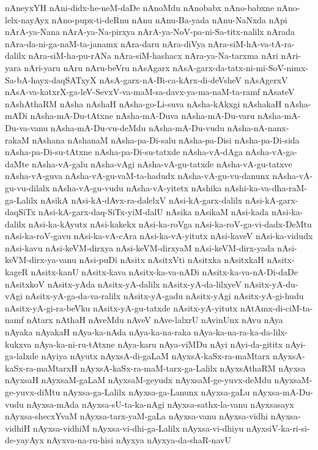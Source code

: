 {nAneyxYH
nAni-didx-he-neM-daDe
nAnoMdu
nAnobabx
nAno-babxne
nAno-lelx-nayAyx
nAno-pupx-ti-deRnu
nAnu
nAnu-Ba-yada
nAnu-NaNxda
nApi
nArA-ya-Nana
nArA-ya-Na-pirxya
nArA-ya-NoV-pa-ni-Sa-titx-nalilx
nArada
nAra-da-ni-ga-naM-ta-janamx
nAra-daru
nAra-diVya
nAra-siM-hA-va-tA-ra-dalilx
nAra-siM-ha-pu-rANa
nAra-siM-hashacx
nAra-ya-Na-tarxma
nAri
nAri-yara
nAri-yaru
nAru
nAru-beVru
nAsAgarx
nAsA-garx-da-tatx-ni-mi-SoV-nimx-Sa-bA-hayx-daqSATxyX
nAsA-garx-nA-Bi-ca-kArx-di-deVsheV
nAsAgerxV
nAsA-va-katxrX-ga-leV-SevxV-va-maM-sa-davx-ya-ma-naM-ta-ramf
nAsateV
nAshAthaRM
nAsha
nAshaH
nAsha-go-Li-suva
nAsha-kAkxgi
nAshakaH
nAsha-mADi
nAsha-mA-Du-tAtxne
nAsha-mA-Duva
nAsha-mA-Du-varu
nAsha-mA-Du-va-vanu
nAsha-mA-Du-vu-deMdu
nAsha-mA-Du-vudu
nAsha-nA-nanx-rakaM
nAshana
nAshanaM
nAsha-pa-Di-salu
nAsha-pa-Disi
nAsha-pa-Di-sida
nAsha-pa-Di-su-tAtxne
nAsha-pa-Di-su-tatxde
nAsha-vA-dAga
nAsha-vA-ga-daMte
nAsha-vA-galu
nAsha-vAgi
nAsha-vA-gu-tatxde
nAsha-vA-gu-tatxve
nAsha-vA-guva
nAsha-vA-gu-vaM-ta-hadudx
nAsha-vA-gu-vu-danunx
nAsha-vA-gu-vu-dilalx
nAsha-vA-gu-vudu
nAsha-vA-yitetx
nAshika
nAshi-ka-va-dha-raM-ga-Lalilx
nAsikA
nAsi-kA-dAvx-ra-dalelxV
nAsi-kA-garx-dalilx
nAsi-kA-garx-daqSiTx
nAsi-kA-garx-daq-SiTx-yiM-dalU
nAsika
nAsikaM
nAsi-kada
nAsi-ka-dalilx
nAsi-ka-kAyutx
nAsi-kakekx
nAsi-ka-roVga
nAsi-ka-roV-ga-vi-dadx-DeMtu
nAsi-ka-roV-gavu
nAsi-ka-vA-cAra
nAsi-ka-vA-yitutx
nAsi-kaveV
nAsi-ka-vidudx
nAsi-kavu
nAsi-keVM-dirxya
nAsi-keVM-dirxyaM
nAsi-keVM-dirx-yada
nAsi-keVM-dirx-ya-vanu
nAsi-puDi
nAsitx
nAsitxVti
nAsitxka
nAsitxkaH
nAsitx-kageR
nAsitx-kanU
nAsitx-kava
nAsitx-ka-va-nADi
nAsitx-ka-va-nA-Di-daDe
nAsitxkoV
nAsitx-yAda
nAsitx-yA-dalilx
nAsitx-yA-da-lilxyeV
nAsitx-yA-du-vAgi
nAsitx-yA-ga-da-va-ralilx
nAsitx-yA-gadu
nAsitx-yAgi
nAsitx-yA-gi-hudu
nAsitx-yA-gi-ra-beVku
nAsitx-yA-gu-tatxde
nAsitx-yA-yitutx
nAtAmx-di-ciM-ta-namf
nAtarx
nAthaH
nAveMdu
nAveV
nAve-lalxrU
nAvinUnx
nAvu
nAya
nAyaka
nAyakaH
nAya-ka-nAda
nAya-ka-na-raka
nAya-ka-na-ra-ka-da-lilx-kukxva
nAya-ka-ni-ru-tAtxne
nAya-karu
nAya-viMDu
nAyi
nAyi-da-gititx
nAyi-ga-lalxde
nAyiya
nAyutx
nAyxsA-di-gaLaM
nAyxsA-kaSx-ra-maMtarx
nAyxsA-kaSx-ra-maMtarxH
nAyxsA-kaSx-ra-maM-tarx-ga-Lalilx
nAyxsAthaRM
nAyxsa
nAyxsaH
nAyxsaM-gaLaM
nAyxsaM-geyudx
nAyxsaM-ge-yuvx-deMdu
nAyxsaM-ge-yuvx-diMtu
nAyxsa-ga-Lalilx
nAyxsa-ga-Lanunx
nAyxsa-gaLu
nAyxsa-mA-Du-vudu
nAyxsa-mAda
nAyxsa-sU-ta-ka-nAgi
nAyxsa-sathx-la-vanu
nAyxsasayx
nAyxsa-shecxYvaM
nAyxsa-tarx-yaM-gaLa
nAyxsa-vanu
nAyxsa-vidhi
nAyxsa-vidhiH
nAyxsa-vidhiM
nAyxsa-vi-dhi-ga-Lalilx
nAyxsa-vi-dhiyu
nAyxsiV-ka-ri-si-de-yayAyx
nAyxva-na-ru-hisi
nAyxya
nAyxya-da-shaR-navU
}
